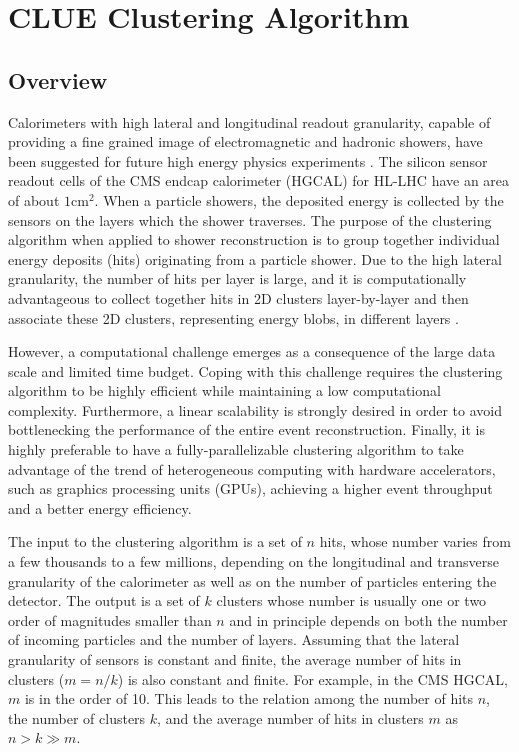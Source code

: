 
\section{CLUE Clustering Algorithm}
\label{sec:clue}

\subsection{Overview}
Calorimeters with high lateral and longitudinal readout granularity, capable of providing a fine grained image of electromagnetic and hadronic showers, have been suggested for future high energy physics experiments \cite{calice2012calorimetry}. The  silicon sensor readout cells of the CMS endcap calorimeter (HGCAL) \cite{Collaboration:2293646} for HL-LHC \cite{Apollinari:2284929} have an area of about $1 \mathrm{cm}^2$.
When a particle showers, the deposited energy is collected by the sensors on the layers which the shower traverses. 
The purpose of the clustering algorithm when applied to shower reconstruction is to group together individual energy deposits (hits) originating from a particle shower. Due to the high lateral granularity, the number of hits per layer is large, and it is computationally advantageous to collect together hits in 2D clusters layer-by-layer \cite{Chen:2017btc} and then associate these 2D clusters, representing energy blobs, in different layers \cite{Collaboration:2293646}.



However, a computational challenge emerges as a consequence of the large data scale and limited time budget. %
Coping with this challenge requires the clustering algorithm to be highly efficient while maintaining a low computational complexity. Furthermore, a linear scalability is strongly desired in order to avoid bottlenecking the performance of the entire event reconstruction.  Finally, it is highly preferable to have a fully-parallelizable clustering algorithm to take advantage of the trend of heterogeneous computing with hardware accelerators, such as graphics processing units (GPUs), achieving a higher event throughput and a better energy efficiency.



The input to the clustering algorithm is a set of $n$ hits, whose number varies from a few thousands to a few millions, depending on the longitudinal and transverse granularity of the calorimeter as well as on the number of particles entering the detector. The output is a set of $k$ clusters whose number is usually one or two order of magnitudes smaller than $n$ and in principle depends on both the number of incoming particles and the number of layers. Assuming that the lateral granularity of sensors is constant and finite, the average number of hits in clusters ($m=n/k$) is also constant and finite. For example, in the CMS HGCAL, $m$ is in the order of 10. This leads to the relation among the number of hits $n$, the number of clusters $k$, and the average number of hits in clusters $m$ as $n > k \gg m$.



